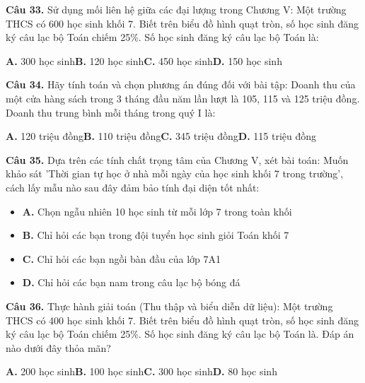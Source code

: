 \documentclass[11pt,a4paper]{article}
\begin{document}
\textbf{\color{primary} Câu 33.} Sử dụng mối liên hệ giữa các đại lượng trong Chương V: Một trường THCS có 600 học sinh khối 7. Biết trên biểu đồ hình quạt tròn, số học sinh đăng ký câu lạc bộ Toán chiếm 25\%. Số học sinh đăng ký câu lạc bộ Toán là:\par
\hspace*{1.5em}\textbf{A.} 300 học sinh\quad\quad \textbf{B.} 120 học sinh\quad\quad \textbf{C.} 450 học sinh\quad\quad \textbf{D.} 150 học sinh\par\vspace{2pt}
\textbf{\color{primary} Câu 34.} Hãy tính toán và chọn phương án đúng đối với bài tập: Doanh thu của một cửa hàng sách trong 3 tháng đầu năm lần lượt là 105, 115 và 125 triệu đồng. Doanh thu trung bình mỗi tháng trong quý I là:\par
\hspace*{1.5em}\textbf{A.} 120 triệu đồng\quad\quad \textbf{B.} 110 triệu đồng\quad\quad \textbf{C.} 345 triệu đồng\quad\quad \textbf{D.} 115 triệu đồng\par\vspace{2pt}
\textbf{\color{primary} Câu 35.} Dựa trên các tính chất trọng tâm của Chương V, xét bài toán: Muốn khảo sát 'Thời gian tự học ở nhà mỗi ngày của học sinh khối 7 trong trường', cách lấy mẫu nào sau đây đảm bảo tính đại diện tốt nhất:\par
\begin{itemize}\setlength{\itemsep}{1pt}\setlength{\parskip}{0pt}
  \item[] \textbf{A.} Chọn ngẫu nhiên 10 học sinh từ mỗi lớp 7 trong toàn khối
  \item[] \textbf{B.} Chỉ hỏi các bạn trong đội tuyển học sinh giỏi Toán khối 7
  \item[] \textbf{C.} Chỉ hỏi các bạn ngồi bàn đầu của lớp 7A1
  \item[] \textbf{D.} Chỉ hỏi các bạn nam trong câu lạc bộ bóng đá
\end{itemize}\vspace{2pt}
\textbf{\color{primary} Câu 36.} Thực hành giải toán (Thu thập và biểu diễn dữ liệu): Một trường THCS có 400 học sinh khối 7. Biết trên biểu đồ hình quạt tròn, số học sinh đăng ký câu lạc bộ Toán chiếm 25\%. Số học sinh đăng ký câu lạc bộ Toán là. Đáp án nào dưới đây thỏa mãn?\par
\hspace*{1.5em}\textbf{A.} 200 học sinh\quad\quad \textbf{B.} 100 học sinh\quad\quad \textbf{C.} 300 học sinh\quad\quad \textbf{D.} 80 học sinh\par\vspace{2pt}
\end{document}
